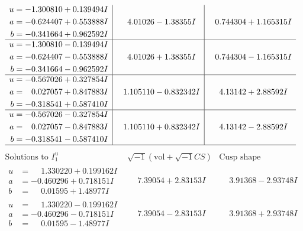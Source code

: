 \documentclass[1p]{elsarticle_modified}
\theoremstyle{definition}
\newcommand{\I}{\sqrt{-1}}
\begin{document}
$$\begin{array}{c|c|c}
\begin{aligned}
u &= -1.300810 + 0.139494 I \\
a &= -0.624407 + 0.553888 I \\
b &= -0.341664 + 0.962592 I\end{aligned}
 & \phantom{-}4.01026 - 1.38355 I & \phantom{-}0.744304 + 1.165315 I \\ \hline\begin{aligned}
u &= -1.300810 - 0.139494 I \\
a &= -0.624407 - 0.553888 I \\
b &= -0.341664 - 0.962592 I\end{aligned}
 & \phantom{-}4.01026 + 1.38355 I & \phantom{-}0.744304 - 1.165315 I \\ \hline\begin{aligned}
u &= -0.567026 + 0.327854 I \\
a &= \phantom{-}0.027057 + 0.847883 I \\
b &= -0.318541 + 0.587410 I\end{aligned}
 & \phantom{-}1.105110 - 0.832342 I & \phantom{-}4.13142 + 2.88592 I \\ \hline\begin{aligned}
u &= -0.567026 - 0.327854 I \\
a &= \phantom{-}0.027057 - 0.847883 I \\
b &= -0.318541 - 0.587410 I\end{aligned}
 & \phantom{-}1.105110 + 0.832342 I & \phantom{-}4.13142 - 2.88592 I\\
 \hline 
 \end{array}$$\newpage$$\begin{array}{c|c|c}  
\text{Solutions to }I^u_{1}& \I (\text{vol} + \sqrt{-1}CS) & \text{Cusp shape}\\
 \hline 
\begin{aligned}
u &= \phantom{-}1.330220 + 0.199162 I \\
a &= -0.460296 + 0.718151 I \\
b &= \phantom{-}0.01595 + 1.48977 I\end{aligned}
 & \phantom{-}7.39054 + 2.83153 I & \phantom{-}3.91368 - 2.93748 I \\ \hline\begin{aligned}
u &= \phantom{-}1.330220 - 0.199162 I \\
a &= -0.460296 - 0.718151 I \\
b &= \phantom{-}0.01595 - 1.48977 I\end{aligned}
 & \phantom{-}7.39054 - 2.83153 I & \phantom{-}3.91368 + 2.93748 I \\ \hline\begin{aligned}

\end{aligned}
\end{array}$$
\end{document}

